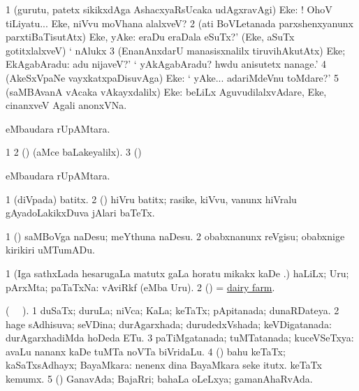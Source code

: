 \bentry
{} 
\gl{\BAavayx}
\bmng
\bnum
\num{1} (gurutu, patetx sikikxdAga AshacxyaRsUcaka udAgxravAgi) Eke: ! OhoV tiLiyatu... Eke, niVvu moVhana alalxveV? 
\num{2} (ati BoVLetanada parxshenxyanunx parxtiBaTisutAtx) Eke, yAke:  eraDu eraDala eSuTx?' (Eke, aSuTx gotitxlalxveV) ` nAlukx 
\num{3} (EnanAnxdarU manasisxnalilx tiruvihAkutAtx) Eke; EkAgabAradu:  adu nijaveV?' ` yAkAgabAradu? hwdu anisutetx nanage.' 
\num{4} (AkeSxVpaNe vayxkatxpaDisuvAga) Eke:  ` yAke... adariMdeVnu toMdare?' 
\num{5} (saMBAvanA vAcaka vAkayxdalilx) Eke:  beLiLx AguvudilalxvAdare, Eke, cinanxveV Agali anonxVNa. 
\enum
\emng
\eentry

\bentry
{}
\gl{\nA}
\bmng
{} eMbaudara rUpAMtara. 
\emng
\eentry

\bentry
{}
\gl{\saMkiSx}
\bmng
\bnum
\num{1}  
\num{2} (\ame)  (aMce baLakeyalilx). 
\num{3} (\birx)  
\enum
\emng
\eentry

\bentry
{}
\gl{\sapUpa}
\bmng
{} eMbaudara rUpAMtara. 
\emng
\eentry

\bentry
{} 
\gl{\nA}
\expl{}
\bmng
\bnum
\num{1} (diVpada) batitx. 
\num{2} (\shaveY) hiVru batitx; rasike, kiVvu, \mo vanunx hiVralu gAyadoLakikxDuva jAlari baTeTx. 
\enum
\emng

\noindent 
\gl{\pagu}
\bmng
\bnum
\num{1}  (\ashi) saMBoVga naDesu; meYthuna naDesu. 
\num{2}  obabxnanunx reVgisu; obabxnige kirikiri uMTumADu. 
\enum
\emng
\eentry

\bentry
{} 
\gl{\nA}
\bmng
\bnum
\num{1} (Iga sathxLada hesarugaLa matutx \saMpa gaLa horatu mikakx kaDe \pArxM.) haLiLx; Uru; pArxMta; paTaTxNa:  vAviRkf (eMba Uru). 
\num{2} (\pArxM) = \hyperref{kandict_d.pdf}{D}{dairy farm}{dairy farm}. 
\enum
\emng
\eentry

\bentry
{}
\gl{\gu} (\tara\  \tama\ ). 
\bmng
\bnum
\num{1} duSaTx; duruLa; niVca; KaLa; keTaTx; pApitanada; dunaRDateya. 
\num{2} hage sAdhisuva; seVDina; durAgarxhada; durudedxVshada; keVDigatanada:  durAgarxhadiMda hoDeda ETu. 
\num{3} paTiMgatanada; tuMTatanada; kuceVSeTxya:  avaLu nananx kaDe tuMTa noVTa biVridaLu. 
\num{4} (\AmA) bahu keTaTx; kaSaTxsAdhayx; BayaMkara:  nenenx dina BayaMkara seke itutx.  keTaTx kemumx. 
\num{5} (\ashi) GanavAda; BajaRri; bahaLa oLeLxya; gamanAhaRvAda. 
\enum
\emng

